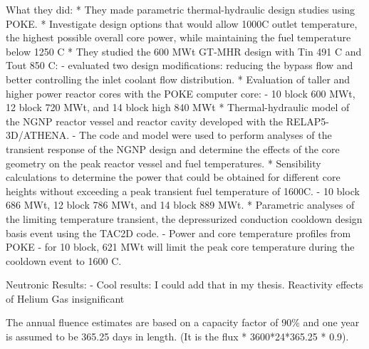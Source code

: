 What they did:
* They made parametric thermal-hydraulic design studies using POKE.
* Investigate design options that would allow 1000C outlet temperature, the highest possible overall core power, while maintaining the fuel temperature below 1250 C
* They studied the 600 MWt GT-MHR design with Tin 491 C and Tout 850 C:
	- evaluated two design modifications: reducing the bypass flow and better controlling the inlet coolant flow distribution.
* Evaluation of taller and higher power reactor cores with the POKE computer core:
	- 10 block 600 MWt, 12 block 720 MWt, and 14 block high 840 MWt
* Thermal-hydraulic model of the NGNP reactor vessel and reactor cavity developed with the RELAP5-3D/ATHENA.
	- The code and model were used to perform analyses of the transient response of the NGNP design and determine the effects of the core geometry on the peak reactor vessel and fuel temperatures.
* Sensibility calculations to determine the power that could be obtained for different core heights without exceeding a peak transient fuel temperature of 1600C.
	- 10 block 686 MWt, 12 block 786 MWt, and 14 block 889 MWt.
* Parametric analyses of the limiting temperature transient, the depressurized conduction cooldown design basis event using the TAC2D code.
	- Power and core temperature profiles from POKE
	- for 10 block, 621 MWt will limit the peak core temperature during the cooldown event to 1600 C.

Neutronic Results:
- Cool results: I could add that in my thesis.
Reactivity effects of Helium Gas insignificant

The annual fluence estimates are based on a capacity factor of 90\% and one year is assumed to be 365.25 days in length. (It is the flux * 3600*24*365.25 * 0.9).



